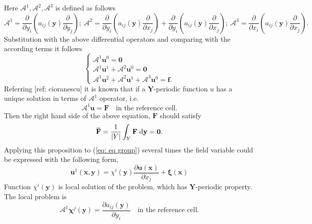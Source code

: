 \documentclass[10pt,a4paper]{scrreprt}
\newcommand{\myd}{\;\mathrm{d}}
\newcommand{\overbar}[1]{\mkern 1.5mu\overline{\mkern-1.5mu#1\mkern-1.5mu}\mkern 1.5mu}
\begin{document}
Here $\mathcal{A}^{1}, \mathcal{A}^{2}, \mathcal{A}^{3}$ is defined as follows
\[
\mathcal{A}^{1} = \dfrac{\partial}{\partial y_{i}} \left( a_{ij}(\mathbf{y}) \dfrac{\partial}{\partial y_{j}} \right); \
\mathcal{A}^{2} = \dfrac{\partial}{\partial y_{i}} \left( a_{ij}(\mathbf{y}) \dfrac{\partial}{\partial x_{j}} \right) + \dfrac{\partial}{\partial y_{i}} \left( a_{ij}(\mathbf{y}) \dfrac{\partial}{\partial x_{j}} \right); \
\mathcal{A}^{3} = \dfrac{\partial}{\partial x_{i}} \left( a_{ij}(\mathbf{y}) \dfrac{\partial}{\partial x_{j}} \right).
\]
Substitution with the above differential operators and comparing with the according terms it follows
\begin{equation}
\label{eq: eq group}
\left\{
\begin{array}{l}
\mathcal{A}^{1} \mathbf{u}^{0} = \mathbf{0} \\
\mathcal{A}^{1} \mathbf{u}^{1} + \mathcal{A}^{2} \mathbf{u}^{0} = \mathbf{0} \\
\mathcal{A}^{1} \mathbf{u}^{2} + \mathcal{A}^{2} \mathbf{u}^{1} + \mathcal{A}^{3} \mathbf{u}^{0} = \mathbf{f}.
\end{array}
\right.
\end{equation}
Referring [ref: cioranescu] it is known that if a $\mathbf{Y}$-periodic function $u$ has a unique solution in terms of $\mathcal{A}^{1}$ operator, i.e. 
\begin{equation}
\mathcal{A}^{1} \mathbf{u} = \mathbf{F} \quad \text{in the reference cell}.
\end{equation}
Then the right hand side of the above equation, $\mathbf{F}$ should satisfy 
\begin{equation}
\overbar{\mathbf{F}} = \dfrac{1}{|Y|}\int_{Y} \mathbf{F} \myd{\mathbf{y}} = \mathbf{0}.
\end{equation}
Applying this proposition to (\ref{eq: eq group}) several times the field variable could be expressed with the following form,
\begin{equation}
\mathbf{u}^{1}(\mathbf{x}, \mathbf{y}) = \chi^{i}(\mathbf{y}) \dfrac{\partial \mathbf{u}(\mathbf{x})}{\partial x_{j}} + \mathbf{\xi} (\mathbf{x})
\end{equation}
Function $\chi^{i}(\mathbf{y})$ is local solution of the problem, which has $\mathbf{Y}$-periodic property. The local problem is
\begin{equation}
\mathcal{A}^{1} \mathbf{\chi}^{j}(\mathbf{y}) = \dfrac{\partial a_{ij}(\mathbf{y})}{\partial y_{i}} \quad \text{in the reference cell}.
\end{equation}
\end{document}
